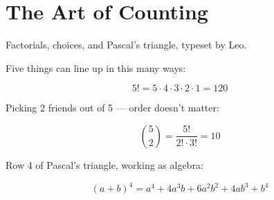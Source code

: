 
\section{The Art of Counting}

Factorials, choices, and Pascal's triangle, typeset by Leo.

Five things can line up in this many ways:

$$ 5! = 5 \cdot 4 \cdot 3 \cdot 2 \cdot 1 = 120 $$

Picking 2 friends out of 5 — order doesn't matter:

$$ \binom{5}{2} = \frac{5!}{2! \cdot 3!} = 10 $$

Row 4 of Pascal's triangle, working as algebra:

$$ (a+b)^4 = a^4 + 4a^3b + 6a^2b^2 + 4ab^3 + b^4 $$
